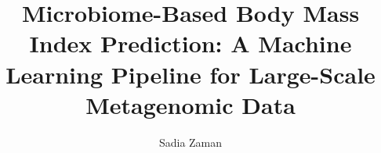 \documentclass[language=english,version=final,mainfont=none,sharelatex=false,pdfaconformance=none]{utuftthesis}
\begin{document}
\title{Microbiome-Based Body Mass Index Prediction: A Machine Learning Pipeline for Large-Scale Metagenomic Data}
\author{Sadia Zaman}

\maketitle


\tableofcontents

\listoffigures

\listoftables










\printbibliography
\end{document}
